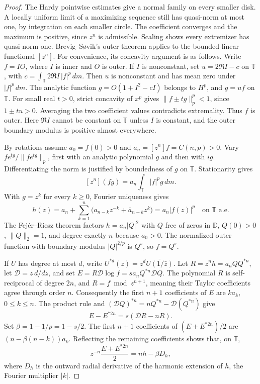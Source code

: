 \documentclass[11pt]{article}
\newcommand{\D}{\mathbb D}
\newcommand{\T}{\mathbb T}
\newcommand{\Dif}{\mathcal D}
\newcommand{\coef}[1]{[z^{#1}]}
\begin{document}
\begin{proof}
The Hardy pointwise estimates give a normal family on every smaller
disk. A locally uniform limit of a maximizing sequence still has
quasi-norm at most one, by integration on each smaller circle.
The coefficient converges and the maximum is positive, since \(z^n\)
is admissible. Scaling shows every extremizer has quasi-norm one.
Brevig--S{\o}vik's outer theorem \cite[Thm.~1]{BrevigSovik} applies
to the bounded linear functional \(\coef n\). For convenience, its
concavity argument is as follows. Write \(f=IO\), where \(I\) is
inner and \(O\) is outer. If \(I\) is nonconstant, set
\(u=2\Re I-c\) on \(\T\), with
\(c=\int_{\T}2\Re I\,|f|^p\,dm\). Then \(u\) is nonconstant and has
mean zero under \(|f|^p\,dm\). The analytic function
\(g=O(1+I^2-cI)\) belongs to \(H^p\), and \(g=uf\) on \(\T\).
For small real \(t>0\), strict concavity of \(x^p\) gives
\(\|f\pm tg\|_p^p<1\), since \(1\pm tu>0\).
Averaging the two coefficient values contradicts extremality.
Thus \(f\) is outer. Here \(\Re I\) cannot be constant on \(\T\)
unless \(I\) is constant, and the outer boundary modulus is positive
almost everywhere.

By rotations assume \(a_0=f(0)>0\) and \(a_n=\coef n f=C(n,p)>0\).
Vary \(f e^{t g}/\|f e^{t g}\|_p\), first with an analytic polynomial
\(g\) and then with \(ig\). Differentiating the norm is justified
by boundedness of \(g\) on \(\T\). Stationarity gives
\[
 \coef n(fg)=a_n\int_{\T}|f|^p g\,dm .
\]
With \(g=z^k\) for every \(k\ge0\), Fourier uniqueness gives
\[
 h(z)=a_n+\sum_{k=1}^n
       \bigl(a_{n-k}z^{-k}+\bar a_{n-k}z^k\bigr)
     =a_n |f(z)|^p \quad\text{on }\T\text{ a.e.}
\]
The Fej\'er--Riesz theorem factors \(h=a_n |Q|^2\) with
\(Q\) free of zeros in \(\D\), \(Q(0)>0\), \(\|Q\|_2=1\), and
degree exactly \(n\) because \(a_0>0\). The normalized outer function
with boundary modulus \(|Q|^{2/p}\) is \(Q^s\), so \(f=Q^s\).

If \(U\) has degree at most \(d\), write \(U^{*d}(z)=
z^d\overline{U(1/\bar z)}\).
Let \(R=z^n h=a_n QQ^{*n}\), let \(\Dif=z\,d/dz\), and set
\(E=R\Dif\log f=s a_n Q^{*n}\Dif Q\).
The polynomial \(R\) is self-reciprocal of degree \(2n\), and
\(R=f\bmod z^{n+1}\), meaning their Taylor coefficients agree through
order \(n\). Consequently the first \(n+1\) coefficients of \(E\)
are \(k a_k\), \(0\le k\le n\). The product rule and
\((\Dif Q)^{*n}=nQ^{*n}-\Dif(Q^{*n})\) give
\[
 E-E^{*2n}=s(\Dif R-nR).
\]
Set \(\beta=1-1/p=1-s/2\). The first \(n+1\) coefficients of
\((E+E^{*2n})/2\) are \((n-\beta(n-k))a_k\).
Reflecting the remaining coefficients shows that, on \(\T\),
\begin{equation}\label{eq:boundary-identity}
 z^{-n}\frac{E+E^{*2n}}{2}=nh-\beta D_h,
\end{equation}
where \(D_h\) is the outward radial derivative of the harmonic
extension of \(h\), the Fourier multiplier \(|k|\).


\end{proof}
\end{document}
